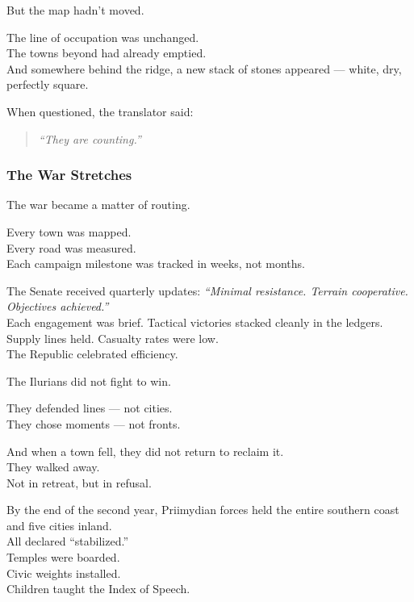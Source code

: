 \documentclass[12pt]{article}
\begin{document}
But the map hadn’t moved.

The line of occupation was unchanged.\\
The towns beyond had already emptied.\\
And somewhere behind the ridge, a new stack of stones appeared --- white, dry, perfectly square.

When questioned, the translator said:

\begin{quote}
\textit{“They are counting.”}
\end{quote}

\dotfill

\subsubsection{The War Stretches}

The war became a matter of routing.

Every town was mapped.\\
Every road was measured.\\
Each campaign milestone was tracked in weeks, not months.

The Senate received quarterly updates: \textit{“Minimal resistance. Terrain cooperative. Objectives achieved.”}\\
Each engagement was brief. Tactical victories stacked cleanly in the ledgers.\\
Supply lines held. Casualty rates were low.\\
The Republic celebrated efficiency.

\vspace{1em}

The Ilurians did not fight to win.

They defended lines — not cities.\\
They chose moments — not fronts.

And when a town fell, they did not return to reclaim it.\\
They walked away.\\
Not in retreat, but in refusal.

\vspace{1em}

By the end of the second year, Priimydian forces held the entire southern coast and five cities inland.\\
All declared “stabilized.”\\
Temples were boarded.\\
Civic weights installed.\\
Children taught the Index of Speech.
\end{document}
